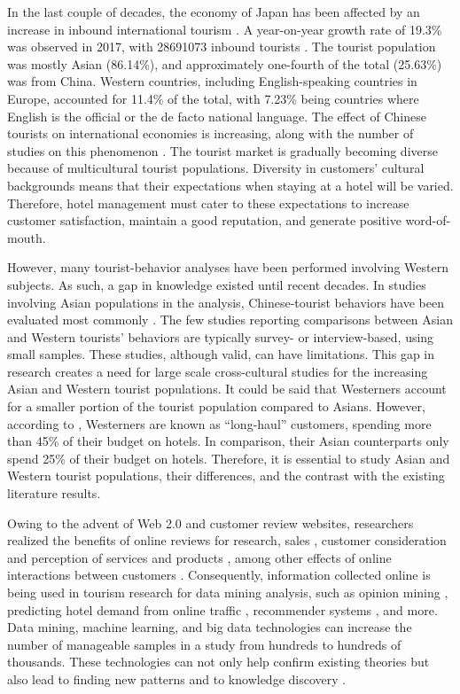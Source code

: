 \documentclass[smallextended,natbib]{svjour3}       %
\begin{document}
  In the last couple of decades, the economy of Japan has been affected by an increase in inbound international tourism \cite[][]{jones2009}. A year-on-year growth rate of 19.3\% was observed in 2017, with \num[group-separator={,}]{28691073} inbound tourists \cite[][]{jnto2003-2019}. The tourist population was mostly Asian (86.14\%), and approximately one-fourth of the total (25.63\%) was from China. Western countries, including English-speaking countries in Europe, accounted for 11.4\% of the total, with 7.23\% being countries where English is the official or the de facto national language. The effect of Chinese tourists on international economies is increasing, along with the number of studies on this phenomenon \cite[][]{sun2017}. The tourist market is gradually becoming diverse because of multicultural tourist populations. Diversity in customers' cultural backgrounds means that their expectations when staying at a hotel will be varied. Therefore, hotel management must cater to these expectations to increase customer satisfaction, maintain a good reputation, and generate positive word-of-mouth.

  However, many tourist-behavior analyses have been performed involving Western subjects. As such, a gap in knowledge existed until recent decades. In studies involving Asian populations in the analysis, Chinese-tourist behaviors have been evaluated most commonly \cite[e.g.][]{liu2019, chang2010, dongyang2015}. The few studies reporting comparisons between Asian and Western tourists’ behaviors \cite[e.g.][]{choi2000} are typically survey- or interview-based, using small samples. These studies, although valid, can have limitations. This gap in research creates a need for large scale cross-cultural studies for the increasing Asian and Western tourist populations. It could be said that Westerners account for a smaller portion of the tourist population compared to Asians. However, according to \cite{choi2000}, Westerners are known as ``long-haul'' customers, spending more than 45\% of their budget on hotels. In comparison, their Asian counterparts only spend 25\% of their budget on hotels. Therefore, it is essential to study Asian and Western tourist populations, their differences, and the contrast with the existing literature results.

  Owing to the advent of Web 2.0 and customer review websites, researchers realized the benefits of online reviews for research, sales  \cite[][]{ye2009, basuroy2003}, customer consideration \cite[][]{vermeulen2009} and perception of services and products \cite[][]{browning2013}, among other effects of online interactions between customers \cite[e.g.][]{xiang2010, ren2019}. Consequently, information collected online is being used in tourism research for data mining analysis, such as opinion mining \cite[e.g.][]{hu2017436}, predicting hotel demand from online traffic \cite[][]{yang2014}, recommender systems \cite[e.g.][]{loh2003}, and more. Data mining, machine learning, and big data technologies can increase the number of manageable samples in a study from hundreds to hundreds of thousands. These technologies can not only help confirm existing theories but also lead to finding new patterns and to knowledge discovery \cite[][]{fayyad1996data}. 
\end{document}
